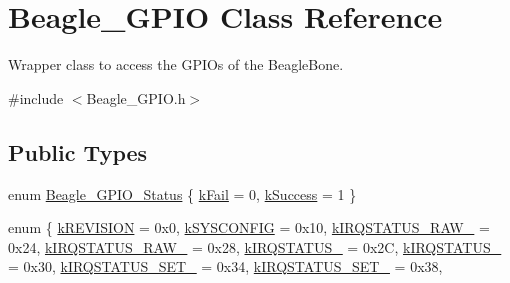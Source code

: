 \hypertarget{class_beagle___g_p_i_o}{\section{\-Beagle\-\_\-\-G\-P\-I\-O \-Class \-Reference}
\label{class_beagle___g_p_i_o}
}


\-Wrapper class to access the \-G\-P\-I\-Os of the \-Beagle\-Bone.  




{\ttfamily \#include $<$\-Beagle\-\_\-\-G\-P\-I\-O.\-h$>$}

\subsection*{\-Public \-Types}
\begin{DoxyCompactItemize}
\item 
enum \hyperlink{class_beagle___g_p_i_o_a40ebd672d74de41bbf5944109e1302ee}{\-Beagle\-\_\-\-G\-P\-I\-O\-\_\-\-Status} \{ \hyperlink{class_beagle___g_p_i_o_a40ebd672d74de41bbf5944109e1302eea115553a9517b306e3bf301889cfc8e8b}{k\-Fail} =  0, 
\hyperlink{class_beagle___g_p_i_o_a40ebd672d74de41bbf5944109e1302eea67ec988d80fec5692e8b893c795da682}{k\-Success} =  1
 \}
\item 
enum \{ \*
\hyperlink{class_beagle___g_p_i_o_ac841d5ad729ca3eec9ddeda852086a28a4733479f85bb944ca3b7a3ac587edd12}{k\-R\-E\-V\-I\-S\-I\-O\-N} =  0x0, 
\hyperlink{class_beagle___g_p_i_o_ac841d5ad729ca3eec9ddeda852086a28a67dc1bc91624f33b689b1e669e2906ce}{k\-S\-Y\-S\-C\-O\-N\-F\-I\-G} =  0x10, 
\hyperlink{class_beagle___g_p_i_o_ac841d5ad729ca3eec9ddeda852086a28a468e61836dc15650b6fbf4db514a7ab6}{k\-I\-R\-Q\-S\-T\-A\-T\-U\-S\-\_\-\-R\-A\-W\-\_} =  0x24, 
\hyperlink{class_beagle___g_p_i_o_ac841d5ad729ca3eec9ddeda852086a28a1a763f396960bf29deb9ef201da940d2}{k\-I\-R\-Q\-S\-T\-A\-T\-U\-S\-\_\-\-R\-A\-W\-\_} =  0x28, 
\*
\hyperlink{class_beagle___g_p_i_o_ac841d5ad729ca3eec9ddeda852086a28a0e986029016be5c7fb13650516bd3f3c}{k\-I\-R\-Q\-S\-T\-A\-T\-U\-S\-\_} =  0x2\-C, 
\hyperlink{class_beagle___g_p_i_o_ac841d5ad729ca3eec9ddeda852086a28a96b61f40f64daae7246c43bc053f1daf}{k\-I\-R\-Q\-S\-T\-A\-T\-U\-S\-\_} =  0x30, 
\hyperlink{class_beagle___g_p_i_o_ac841d5ad729ca3eec9ddeda852086a28a40d1c2177900e08fa0a82f32a843c096}{k\-I\-R\-Q\-S\-T\-A\-T\-U\-S\-\_\-\-S\-E\-T\-\_} =  0x34, 
\hyperlink{class_beagle___g_p_i_o_ac841d5ad729ca3eec9ddeda852086a28a4a85feeabc32101602bbe924dafc701d}{k\-I\-R\-Q\-S\-T\-A\-T\-U\-S\-\_\-\-S\-E\-T\-\_} =  0x38, 

\end{DoxyCompactItemize}
